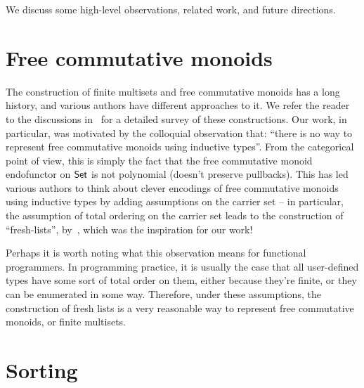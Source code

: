 \label{sec:discussion}

We discuss some high-level observations, related work, and future directions.

\section{Free commutative monoids}

The construction of finite multisets and free commutative monoids has a long history, and various authors have different
approaches to it. We refer the reader to the discussions
in~\cite{choudhuryFreeCommutativeMonoids2023,joramConstructiveFinalSemantics2023} for a detailed survey of these
constructions.
%
Our work, in particular, was motivated by the colloquial observation that:
``there is no way to represent free commutative monoids using inductive types''.
%
From the categorical point of view, this is simply the fact that the free commutative monoid endofunctor on $\mathsf{Set}$ is
not polynomial (doesn't preserve pullbacks).
%
This has led various authors to think about clever encodings of free commutative monoids using inductive types by adding
assumptions on the carrier set -- in particular, the assumption of total ordering on the carrier set leads to the
construction of ``fresh-lists'', by~\cite{kupkeFreshLookCommutativity2023}, which was the inspiration for our work!

Perhaps it is worth noting what this observation means for functional programmers.
%
In programming practice, it is usually the case that all user-defined types have some sort of total order on them,
either because they're finite, or they can be enumerated in some way.
%
Therefore, under these assumptions, the construction of fresh lists is a very reasonable way to represent free
commutative monoids, or finite multisets.

\section{Sorting}

